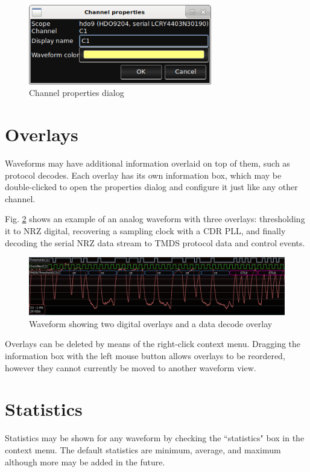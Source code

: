 \begin{figure}[H]
\centering
\includegraphics[width=8cm]{images/channel-properties.png}
\caption{Channel properties dialog}
\label{channel-properties}
\end{figure}

\section{Overlays}

Waveforms may have additional information overlaid on top of them, such as protocol decodes. Each overlay has its own
information box, which may be double-clicked to open the properties dialog and configure it just like any other
channel.

Fig. \ref{overlays} shows
an example of an analog waveform with three overlays: thresholding it to NRZ digital, recovering a sampling
clock with a CDR PLL, and finally decoding the serial NRZ data stream to TMDS protocol data and control events.

\begin{figure}[H]
\centering
\includegraphics[width=14cm]{images/overlays.png}
\caption{Waveform showing two digital overlays and a data decode overlay}
\label{overlays}
\end{figure}

Overlays can be deleted by means of the right-click context menu. Dragging the information box with the left mouse
button allows overlays to be reordered, however they cannot currently be moved to another waveform view.

\section{Statistics}

Statistics may be shown for any waveform by checking the ``statistics" box in the context menu. The default statistics
are minimum, average, and maximum although more may be added in the future.
